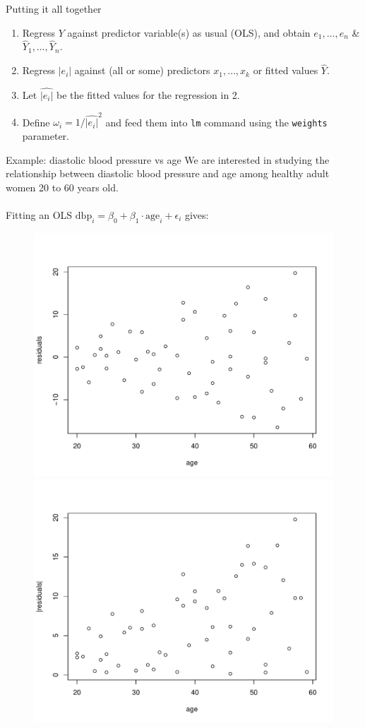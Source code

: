 \documentclass{beamer}
\begin{document}
\begin{frame}[fragile]{Putting it all together}
\begin{enumerate}
    \item Regress $Y$ against predictor variable(s) as usual (OLS), and obtain $e_1,\ldots, e_n$ \& $\hat{Y}_1, \ldots, \hat{Y}_n$.
    \item<2-> Regress $|e_i|$ against (all or some) predictors $x_1, \ldots, x_k$ or fitted values $\hat{Y}$.
    \item<3-> Let $\widehat{|e_i|}$ be the fitted values for the regression in 2.
    \item<4-> Define $\omega_i = 1/\widehat{|e_i|}^2$ and feed them into \verb|lm| command using the \verb|weights| parameter.
\end{enumerate}    
\end{frame}

\begin{frame}{Example: diastolic blood pressure vs age}
We are interested in studying the relationship between diastolic blood pressure and age among healthy adult women 20 to 60 years old.\\~\\

\pause Fitting an OLS $\text{dbp}_i=\beta_0+\beta_1\cdot\text{age}_i+\epsilon_i$ gives:
\begin{figure}
    \includegraphics[width=.49\textwidth]{plots/res_age.pdf}\includegraphics[width=.49\textwidth]{plots/abs_res_age.pdf}
\end{figure}    
\end{frame}
\end{document}
